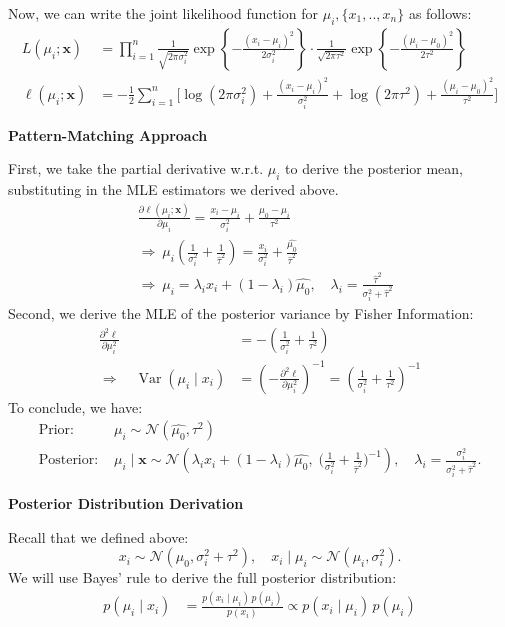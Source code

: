 \documentclass[letterpaper, 11pt]{extarticle}
\begin{document}
Now, we can write the joint  likelihood function for $\mu_i, \{x_1,..,x_n\}$ as follows:
\begin{align}
L(\mu_i; \mathbf{x})
&=\prod_{i=1}^{n}
\frac{1}{\sqrt{2\pi\sigma_i^2}}
\exp\!\left\{-\frac{(x_i-\mu_i)^2}{2\sigma_i^2}\right\}
\cdot
\frac{1}{\sqrt{2\pi\tau^2}}
\exp\!\left\{-\frac{(\mu_i-\mu_0)^2}{2\tau^2}\right\}\\
\ell(\mu_i; \mathbf{x})
&= -\frac{1}{2}\sum_{i=1}^{n}\Bigg[
\log(2\pi\sigma_i^2)+\frac{(x_i-\mu_i)^2}{\sigma_i^2}
+\log(2\pi\tau^2)+\frac{(\mu_i-\mu_0)^2}{\tau^2}
\Bigg]
\end{align}


\textsf{\textbf{Pattern-Matching Approach}}

First, we take the partial derivative w.r.t. $\mu_i$ to derive the posterior mean, substituting in the MLE estimators we derived above.
\begin{align}
    &\frac{\partial \ell(\mu_i; \mathbf{x})}{\partial \mu_i}
= \frac{x_i-\mu_i}{\sigma_i^2}+\frac{\mu_0-\mu_i}{\tau^2}\\
&\Rightarrow\ \mu_i\left(\frac{1}{\sigma_i^2}+\frac{1}{\hat{\tau}^2}\right)
=\frac{x_i}{\sigma_i^2}+\frac{\hat{\mu_0}}{\hat{\tau}^2}
\\&\Rightarrow
\ \mu_i
=\lambda_i x_i+(1-\lambda_i)\hat{\mu_0}, \quad 
\lambda_i=\frac{\hat{\tau}^2}{\sigma_i^2+\hat{\tau}^2}
\end{align}
Second, we derive the MLE of the posterior variance by Fisher Information:
\begin{align}
\frac{\partial^2 \ell}{\partial \mu_i^2} 
&= -\left( \frac{1}{\sigma_i^2} + \frac{1}{\tau^2} \right) \\[8pt]
\Rightarrow\quad 
\operatorname{Var}(\mu_i \mid x_i) 
&= \left( -\frac{\partial^2 \ell}{\partial \mu_i^2} \right)^{-1} 
= \left( \frac{1}{\sigma_i^2} + \frac{1}{\tau^2} \right)^{-1}
\end{align}
To conclude, we have:
\begin{align}
    \textrm{Prior: }&\mu_i \sim \mathcal{N}(\hat{\mu_0}, \tau^2)\\
    \textrm{Posterior: }& \mu_i \mid \mathbf{x} \sim \mathcal{N}\left(
\lambda_i x_i+(1-\lambda_i)\hat{\mu_0},\;
\Big(\frac{1}{\sigma_i^2}+\frac{1}{\hat{\tau}^2}\Big)^{-1}
\right), \quad \lambda_i=\frac{\sigma_i^2}{\sigma_i^2+\hat{\tau}^2}.
\end{align}

\textsf{\textbf{Posterior Distribution Derivation}}

Recall that we defined above:
$$x_i \sim \mathcal{N}(\mu_0, \sigma_i^2+\tau^2), \quad x_i \mid \mu_i \sim \mathcal{N}(\mu_i, \sigma_i^2).$$
We will use Bayes' rule to derive the full posterior distribution:
\begin{align}
p(\mu_i \mid x_i)
&=\frac{p(x_i \mid \mu_i)\,p(\mu_i)}{p(x_i)} \propto
p(x_i \mid \mu_i)\,p(\mu_i)
\end{align}
\end{document}
